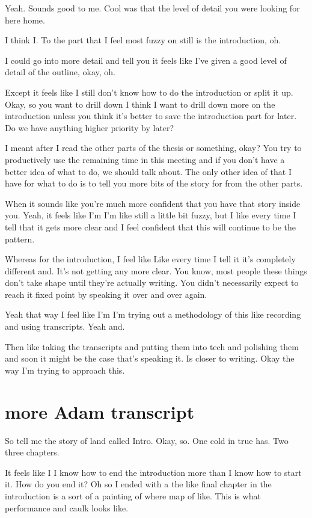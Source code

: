 \begin{subappendices}
Yeah. Sounds good to me. Cool was that the level of detail you were looking for here home.

I think I. To the part that I feel most fuzzy on still is the introduction, oh.

I could go into more detail and tell you it feels like I've given a good level of detail of the outline, okay, oh.

Except it feels like I still don't know how to do the introduction or split it up. Okay, so you want to drill down I think I want to drill down more on the introduction unless you think it's better to save the introduction part for later. Do we have anything higher priority by later?

I meant after I read the other parts of the thesis or something, okay? You try to productively use the remaining time in this meeting and if you don't have a better idea of what to do, we should talk about. The only other idea of that I have for what to do is to tell you more bits of the story for from the other parts.

When it sounds like you're much more confident that you have that story inside you. Yeah, it feels like I'm I'm like still a little bit fuzzy, but I like every time I tell that it gets more clear and I feel confident that this will continue to be the pattern.

Whereas for the introduction, I feel like Like every time I tell it it's completely different and. It's not getting any more clear. You know, most people these things don't take shape until they're actually writing. You didn't necessarily expect to reach it fixed point by speaking it over and over again.

Yeah that way I feel like I'm I'm trying out a methodology of this like recording and using transcripts. Yeah and.

Then like taking the transcripts and putting them into tech and polishing them and soon it might be the case that's speaking it. Is closer to writing. Okay the way I'm trying to approach this.

\section{more Adam transcript}

So tell me the story of land called Intro. Okay, so. One cold in true has. Two three chapters.

It feels like I I know how to end the introduction more than I know how to start it. How do you end it? Oh so I ended with a the like final chapter in the introduction is a sort of a painting of where map of like. This is what performance and caulk looks like.

\end{subappendices}
